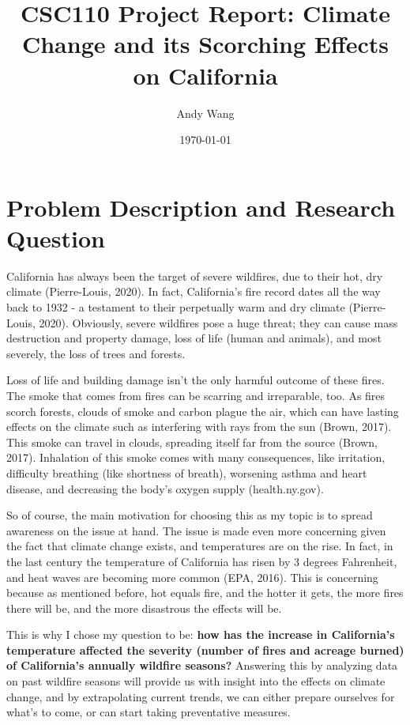 \documentclass[fontsize=11pt]{article}
\title{CSC110 Project Report: Climate Change and its Scorching Effects on California}
\author{Andy Wang}
\date{\today}
\begin{document}
\maketitle

\section*{Problem Description and Research Question}
California has always been the target of severe wildfires, due to their hot, dry climate (Pierre-Louis, 2020). In fact, California's fire record dates all the way back to 1932 - a testament to their perpetually warm and dry climate (Pierre-Louis, 2020). Obviously, severe wildfires pose a huge threat; they can cause mass destruction and property damage, loss of life (human and animals), and most severely, the loss of trees and forests.

Loss of life and building damage isn't the only harmful outcome of these fires. The smoke that comes from fires can be scarring and irreparable, too. As fires scorch forests, clouds of smoke and carbon plague the air, which can have lasting effects on the climate such as interfering with rays from the sun (Brown, 2017). This smoke can travel in clouds, spreading itself far from the source (Brown, 2017). Inhalation of this smoke comes with many consequences, like irritation, difficulty breathing (like shortness of breath), worsening asthma and heart disease, and decreasing the body's oxygen supply (health.ny.gov).

So of course, the main motivation for choosing this as my topic is to spread awareness on the issue at hand. The issue is made even more concerning given the fact that climate change exists, and temperatures are on the rise. In fact, in the last century the temperature of California has risen by 3 degrees Fahrenheit, and heat waves are becoming more common (EPA, 2016). This is concerning because as mentioned before, hot equals fire, and the hotter it gets, the more fires there will be, and the more disastrous the effects will be.

This is why I chose my question to be: \textbf{how has the increase in California's temperature affected the severity (number of fires and acreage burned) of California's
annually wildfire seasons?} Answering this by analyzing data on past wildfire seasons will provide us with insight into the effects on climate change, and by extrapolating current trends, we can either prepare ourselves for what's to come, or can start taking preventative measures.
\end{document}
